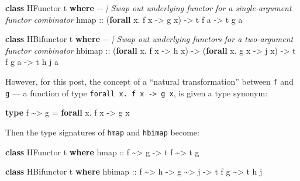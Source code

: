\documentclass[]{article}
\newenvironment{Shaded}{}{}
\newcommand{\CommentTok}[1]{\textcolor[rgb]{0.38,0.63,0.69}{\textit{#1}}}
\newcommand{\DataTypeTok}[1]{\textcolor[rgb]{0.56,0.13,0.00}{#1}}
\newcommand{\KeywordTok}[1]{\textcolor[rgb]{0.00,0.44,0.13}{\textbf{#1}}}
\newcommand{\NormalTok}[1]{#1}
\newcommand{\OperatorTok}[1]{\textcolor[rgb]{0.40,0.40,0.40}{#1}}
\newcommand{\OtherTok}[1]{\textcolor[rgb]{0.00,0.44,0.13}{#1}}
\begin{document}
\begin{Shaded}
\begin{Highlighting}[]
\KeywordTok{class} \DataTypeTok{HFunctor}\NormalTok{ t }\KeywordTok{where}
    \CommentTok{{-}{-} | Swap out underlying functor for a single{-}argument functor combinator}
\NormalTok{    hmap}
\OtherTok{        ::}\NormalTok{ (}\KeywordTok{forall}\NormalTok{ x}\OperatorTok{.}\NormalTok{ f x }\OtherTok{{-}>}\NormalTok{ g x)}
        \OtherTok{{-}>}\NormalTok{ t f a}
        \OtherTok{{-}>}\NormalTok{ t g a}

\KeywordTok{class} \DataTypeTok{HBifunctor}\NormalTok{ t }\KeywordTok{where}
    \CommentTok{{-}{-} | Swap out underlying functors for a two{-}argument functor combinator}
\NormalTok{    hbimap}
\OtherTok{        ::}\NormalTok{ (}\KeywordTok{forall}\NormalTok{ x}\OperatorTok{.}\NormalTok{ f x }\OtherTok{{-}>}\NormalTok{ h x)}
        \OtherTok{{-}>}\NormalTok{ (}\KeywordTok{forall}\NormalTok{ x}\OperatorTok{.}\NormalTok{ g x }\OtherTok{{-}>}\NormalTok{ j x)}
        \OtherTok{{-}>}\NormalTok{ t f g a}
        \OtherTok{{-}>}\NormalTok{ t h j a}
\end{Highlighting}
\end{Shaded}

However, for this post, the concept of a ``natural transformation'' between
\texttt{f} and \texttt{g} --- a function of type
\texttt{forall\ x.\ f\ x\ -\textgreater{}\ g\ x}, is given a type synonym:

\begin{Shaded}
\begin{Highlighting}[]
\KeywordTok{type}\NormalTok{ f }\OperatorTok{\textasciitilde{}>}\NormalTok{ g }\OtherTok{=} \KeywordTok{forall}\NormalTok{ x}\OperatorTok{.}\NormalTok{ f x }\OtherTok{{-}>}\NormalTok{ g x}
\end{Highlighting}
\end{Shaded}

Then the type signatures of \texttt{hmap} and \texttt{hbimap} become:

\begin{Shaded}
\begin{Highlighting}[]
\KeywordTok{class} \DataTypeTok{HFunctor}\NormalTok{ t }\KeywordTok{where}
\NormalTok{    hmap}
\OtherTok{        ::}\NormalTok{ f }\OperatorTok{\textasciitilde{}>}\NormalTok{ g}
        \OtherTok{{-}>}\NormalTok{ t f }\OperatorTok{\textasciitilde{}>}\NormalTok{ t g}

\KeywordTok{class} \DataTypeTok{HBifunctor}\NormalTok{ t }\KeywordTok{where}
\NormalTok{    hbimap}
\OtherTok{        ::}\NormalTok{ f }\OperatorTok{\textasciitilde{}>}\NormalTok{ h}
        \OtherTok{{-}>}\NormalTok{ g }\OperatorTok{\textasciitilde{}>}\NormalTok{ j}
        \OtherTok{{-}>}\NormalTok{ t f g }\OperatorTok{\textasciitilde{}>}\NormalTok{ t h j}
\end{Highlighting}
\end{Shaded}
\end{document}
